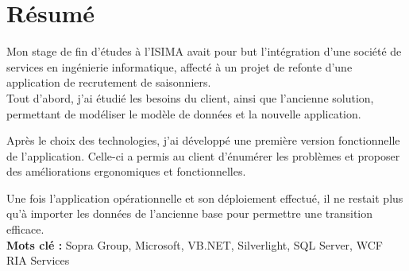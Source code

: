\cleardoublepage

\chapter*{Résumé}

\thispagestyle{empty}



Mon stage de fin d'études à l'ISIMA avait pour but l'intégration d'une société de services en ingénierie informatique, affecté à un projet de refonte d'une application de recrutement de saisonniers.
\\

Tout d'abord, j'ai étudié les besoins du client, ainsi que l'ancienne solution, permettant de modéliser le modèle de données et la nouvelle application.

Après le choix des technologies, j'ai développé une première version fonctionnelle de l'application.
Celle-ci a permis au client d'énumérer les problèmes et proposer des améliorations ergonomiques et fonctionnelles.

Une fois l'application opérationnelle et son déploiement effectué, il ne restait plus qu'à importer les données de l'ancienne base pour permettre une transition efficace.
\\

\textbf{Mots clé : } Sopra Group, Microsoft, VB.NET, Silverlight, SQL Server, WCF RIA Services